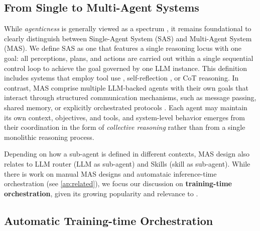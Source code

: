 \subsection{From Single to Multi-Agent Systems}
While \textit{agenticness} is generally viewed as a spectrum \cite{kapoor2024ai}, it remains foundational to clearly distinguish between Single-Agent System (SAS) and Multi-Agent System (MAS). We define SAS as one that features a single reasoning locus {with one goal}: all perceptions, plans, and actions are carried out within a single sequential control loop {to achieve the goal} governed by one LLM instance. This definition includes systems that employ tool use \citep{yao2023react}, self-reflection \citep{madaan2024self}, or CoT reasoning. In contrast, MAS comprise multiple LLM-backed agents {with their own goals} that interact through structured communication mechanisms, such as message passing, shared memory, or explicitly orchestrated protocols \citep{xi2023risepotentiallargelanguage}. Each agent may maintain its own context, objectives, and tools, and system-level behavior emerges from their coordination {in the form of \emph{collective reasoning}} rather than from a single monolithic reasoning process.


Depending on how a sub-agent is defined in different contexts, MAS design also relates to LLM router {\citep{su2025toolorchestraelevatingintelligenceefficient,zhang2025routerr1teachingllmsmultiround}}  (LLM as sub-agent) and Skills \citep{anthropic_agent_skills_2024} (skill as sub-agent). While there is work on manual MAS designs and automataic inference-time orchestration (see \cref{ap:related}), we focus our discussion on \textbf{training-time orchestration}, given its growing popularity and relevance to \ourframework. 

\subsection{Automatic Training-time Orchestration}


